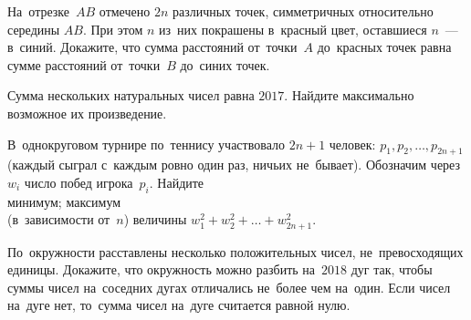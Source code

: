 


\begin{problems}

\item
На~отрезке~$AB$ отмечено $2n$ различных точек, симметричных относительно
середины $AB$.
При этом $n$ из~них покрашены в~красный цвет, оставшиеся $n$~--- в~синий.
Докажите, что сумма расстояний от~точки~$A$ до~красных точек равна сумме
расстояний от~точки~$B$ до~синих точек.

\item
Сумма нескольких натуральных чисел равна $2017$.
Найдите максимально возможное их произведение.


\item
В~однокруговом турнире по~теннису участвовало $2n+1$ человек:
$p_{1}, p_{2}, \ldots, p_{2n+1}$
(каждый сыграл с~каждым ровно один раз, ничьих не~бывает).
Обозначим через~$w_{i}$ число побед игрока~$p_{i}$.
Найдите
\\
\subproblem минимум;
\qquad
\subproblem максимум
\\
(в~зависимости от~$n$) величины
$w_{1}^2 + w_{2}^2 + \ldots + w_{2n+1}^2$.


\item
По~окружности расставлены несколько положительных чисел, не~превосходящих
единицы.
Докажите, что окружность можно разбить на~$2018$ дуг так, чтобы суммы чисел
на~соседних дугах отличались не~более чем на~один.
Если чисел на~дуге нет, то~сумма чисел на~дуге считается равной нулю.


\end{problems}
